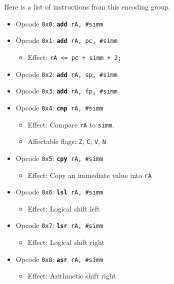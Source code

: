 \documentclass{article}
\begin{document}
	Here is a list of instructions from this encoding group.

	\singlespacing
	\begin{itemize}
	\item Opcode \texttt{0x0}:
		\texttt{\textbf{add} rA, \#simm}
	\item Opcode \texttt{0x1}:
		\texttt{\textbf{add} rA, pc, \#simm}
		\begin{itemize}
		\item Effect:
			\texttt{rA <= pc + simm + 2;}
		\end{itemize}
	\item Opcode \texttt{0x2}:
		\texttt{\textbf{add} rA, sp, \#simm}
	\item Opcode \texttt{0x3}:
		\texttt{\textbf{add} rA, fp, \#simm}
	\item Opcode \texttt{0x4}:
		\texttt{\textbf{cmp} rA, \#simm}
		\begin{itemize}
		\item Effect: Compare \texttt{rA} to \texttt{simm}.
		\item Affectable flags:
			\texttt{Z}, \texttt{C}, \texttt{V}, \texttt{N}
		\end{itemize}
	\item Opcode \texttt{0x5}:
		\texttt{\textbf{cpy} rA, \#simm}
		\begin{itemize}
		\item Effect: Copy an immediate value into \texttt{rA}
		\end{itemize}
	\item Opcode \texttt{0x6}:
		\texttt{\textbf{lsl} rA, \#simm}
		\begin{itemize}
		\item Effect: Logical shift left
		\end{itemize}
	\item Opcode \texttt{0x7}:
		\texttt{\textbf{lsr} rA, \#simm}
		\begin{itemize}
		\item Effect: Logical shift right
		\end{itemize}
	\item Opcode \texttt{0x8}:
		\texttt{\textbf{asr} rA, \#simm}
		\begin{itemize}
		\item Effect: Arithmetic shift right

\end{itemize}
\end{itemize}
\end{document}

